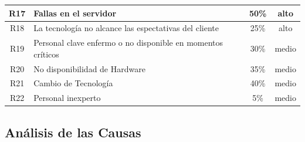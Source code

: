 \documentclass[11pt,letterpaper]{report}
\begin{document}
\begin{tabular}{|c|l|c|c|}
	R17 & Fallas en el servidor & 50\% & alto \\ \hline
	R18 & La tecnología no alcance las espectativas del cliente & 25\% & alto \\ \hline
	R19 & Personal clave enfermo o no disponible en momentos críticos & 30\% & medio \\ \hline
	R20 & No disponibilidad de Hardware & 35\% & medio \\ \hline
	R21 & Cambio de Tecnología & 40\% & medio \\ \hline
	R22 & Personal inexperto & 5\% & medio \\ \hline
\end{tabular}

\subsection{Análisis de las Causas}
\end{document}
